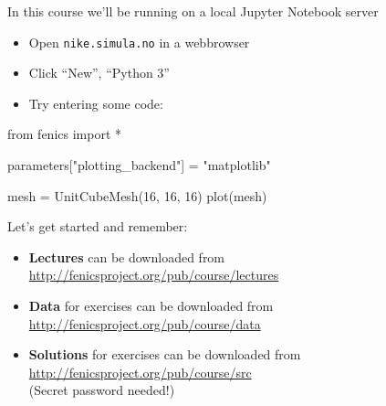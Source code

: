 \documentclass{fenicscourse}
\begin{document}
%









\begin{frame}[fragile]
{In this course we'll be running on a local Jupyter Notebook server}
\begin{itemize}
\item Open \texttt{nike.simula.no} in a webbrowser
\item Click ``New'', ``Python 3''
\item Try entering some code:
\end{itemize}
\begin{python}
from fenics import *

parameters["plotting_backend"] = "matplotlib"

mesh = UnitCubeMesh(16, 16, 16)
plot(mesh)
\end{python}
\end{frame}


\begin{frame}{Let's get started and remember:}

\linespread{2.0}
\bigskip
\begin{itemize}
\item
{\footnotesize \textbf{Lectures} can be downloaded from
  \url{http://fenicsproject.org/pub/course/lectures}}

\item
{\footnotesize \textbf{Data} for exercises can be downloaded from
  \url{http://fenicsproject.org/pub/course/data}}

\item
{\footnotesize \textbf{Solutions} for exercises can be downloaded from
  \url{http://fenicsproject.org/pub/course/src} \\
(Secret password needed!)
}
\end{itemize}
\linespread{1.0}\

\end{frame}
\end{document}
